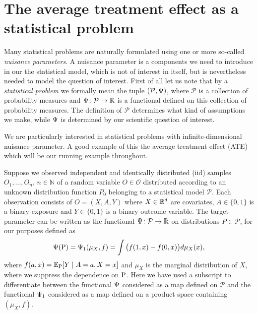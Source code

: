 \documentclass[a4,danish]{article}
\begin{document}


\section{The average treatment effect as a statistical problem}
\label{sec:introduction}

Many statistical problems are naturally formulated using one or more so-called \textit{nuisance
  parameters}. A nuisance parameter is a components we need to introduce in our the statistical
model, which is not of interest in itself, but is nevertheless needed to model the question of
interest. First of all let us note that by a \textit{statistical problem} we formally mean the tuple
$(\mathcal{P}, \TT)$, where $\mathcal{P}$ is a collection of probability measures and
$\TT \colon \mathcal{P} \rightarrow \R$ is a functional defined on this collection of probability
measures. The definition of $\mathcal{P}$ determines what kind of assumptions we make, while $\TT$
is determined by our scientific question of interest. 

We are particularly interested in statistical problems with infinite-dimensional nuisance parameter.
A good example of this the average treatment effect (ATE) which will be our running example
throughout.

\begin{example}[ATE]
  \label{example:aver-treatm-effect}
  Suppose we observed independent and identically distributed (iid) samples \(O_1,\ldots,O_n\),
  \(n\in\mathbb{N}\) of a random variable \(O \in\mathcal{O}\) distributed according to an unknown
  distribution function \(P_0\) belonging to a statistical model \(\mathcal{P}\). Each observation
  consists of \(O= (X, A, Y)\) where \(X\in \R^d\) are covariates, \(A\in \lbrace 0,1\rbrace\) is a
  binary exposure and \(Y\in\lbrace 0, 1\rbrace\) is a binary outcome variable. The target parameter
  can be written as the functional \(\TT \colon \mathcal{P} \rightarrow \R\) on distributions
  \(P\in\mathcal{P}\), for our purposes defined as
  \begin{align}
    \TT(\P) = \TT_1( \mu_X, f) = \int \big( f( 1, x) - f(0, x) \big) d\mu_X (x), 
    \label{eq:Psi:ate}
  \end{align}
  where \(f (a, x) = \E_{\P} [ Y \mid A=a, X=x]\) and \(\mu_X \) is the marginal distribution of
  \(X\), where we suppress the dependence on $\P$. Here we have used a subscript to differentiate
  between the functional $\TT$ considered as a map defined on $\mathcal{P}$ and the functional
  $\TT_1$ considered as a map defined on a product space containing $(\mu_X, f)$.
\end{example}
\end{document}
